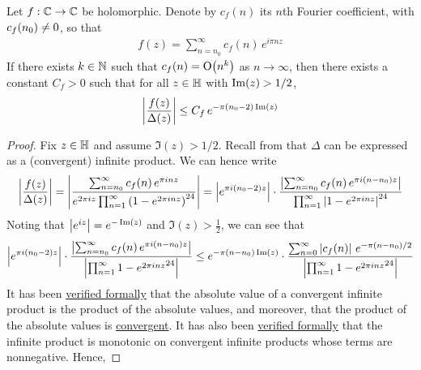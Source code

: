 \begin{boxtheorem}\label{SP:PolyFourierCoeffBound}
    Let $f : \mathbb{C} \to \mathbb{C}$ be holomorphic. Denote by $c_f(n)$ its $n$th Fourier coefficient, with $c_f\!\left( n_0 \right) \neq 0$, so that
    \begin{align*}
        f(z) = \sum_{n=n_0}^{\infty} c_f(n) \, e^{i \pi n z}
    \end{align*}
    If there exists $k \in \mathbb{N}$ such that $c_f(n) = \operatorname{O}\!\left( n^k \right)$ as $n \to \infty$, then there exists a constant $C_f > 0$ such that for all $z \in \mathbb{H}$ with $\operatorname{Im}\!\left( z \right) > 1/2$,
    \begin{align*}
        \left\lvert \frac{f(z)}{\Delta(z)} \right\rvert \leq C_f \, e^{-\pi \left( n_0 - 2 \right) \operatorname{Im}(z)}
    \end{align*}
\end{boxtheorem}
\begin{proof}
    Fix $z \in \mathbb{H}$ and assume $\Im(z) > 1/2$. Recall from  that $\Delta$ can be expressed as a (convergent) infinite product. We can hence write
    \begin{align*}
        \left\lvert \frac{f(z)}{\Delta(z)} \right\rvert
        = \left\lvert \frac{\sum_{n = n_0}^{\infty} c_f(n) \, e^{\pi i n z}}{e^{2 \pi i z} \prod_{n=1}^{\infty} \left( 1 - e^{2 \pi i n z} \right)^{24}} \right\rvert
        = \left\lvert e^{\pi i \left( n_0 - 2 \right) z} \right\rvert \cdot \frac{\left\lvert \sum_{n=n_0}^{\infty} c_f(n) \, e^{\pi i \left( n - n_0 \right) z} \right\rvert}{\prod_{n=1}^{\infty} \left\lvert 1 - e^{2 \pi i n z} \right\rvert^{24}}
    \end{align*}
    Noting that $\left\lvert e^{iz} \right\rvert = e^{-\operatorname{Im}(z)}$ and $\Im(z) > \frac{1}{2}$, we can see that
    \begin{align*}
        \left\lvert e^{\pi i \left( n_0 - 2 \right) z} \right\rvert \cdot \frac{\left\lvert \sum_{n=n_0}^{\infty} c_f(n) \, e^{\pi i \left( n - n_0 \right) z} \right\rvert}{\left\lvert \prod_{n=1}^{\infty} {1 - e^{2 \pi i n z}}^{24} \right\rvert}
        \leq
        e^{-\pi \left( n - n_0 \right) \operatorname{Im}(z)} \cdot \frac{\sum_{n=0}^{\infty} \left\lvert c_f(n) \right\rvert \, e^{-\pi \left( n - n_0 \right)/2}}{\left\lvert \prod_{n=1}^{\infty} {1 - e^{2 \pi i n z}}^{24} \right\rvert}
    \end{align*}
    It has been \href{https://github.com/leanprover-community/mathlib4/blob/5a2eaa85c555c4263e15928cef249cbaad2eb2d2/Mathlib/Topology/Algebra/InfiniteSum/Order.lean#L379-L380}{verified formally} that the absolute value of a convergent infinite product is the product of the absolute values, and moreover, that the product of the absolute values is \href{https://github.com/leanprover-community/mathlib4/blob/5a2eaa85c555c4263e15928cef249cbaad2eb2d2/Mathlib/Topology/Algebra/InfiniteSum/Order.lean#L373-L374}{convergent}. It has also been \href{https://github.com/thefundamentaltheor3m/Sphere-Packing-Lean/blob/ba092be9cdebb1a9c170a22c234e71ca1842a173/SpherePacking/ForMathlib/tprod.lean#L28}{verified formally} that the infinite product is monotonic on convergent infinite products whose terms are nonnegative. Hence,

\end{proof}
